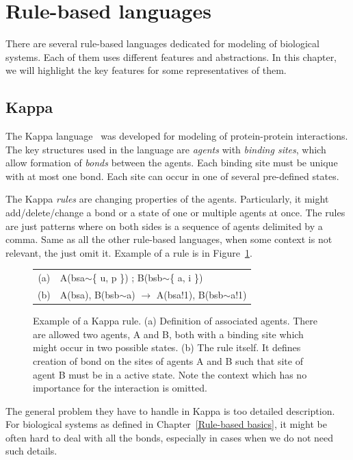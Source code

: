 \documentclass[12pt]{fithesis2}
\begin{document}
\section{Rule-based languages}
\label{rule_based_languages}

There are several rule-based languages dedicated for modeling of biological systems. Each of them uses different features and abstractions. In this chapter, we will highlight the key features for some representatives of them.

\subsection{Kappa}
\label{kappa}

The Kappa language~\cite{kappa_formal} was developed for modeling of protein-protein interactions. The key structures used in the language are \textit{agents} with \textit{binding sites}, which allow formation of \emph{bonds} between the agents. Each binding site must be unique with at most one bond. Each site can occur in one of several pre-defined states.

The Kappa \textit{rules} are changing properties of the agents. Particularly, it might add/delete/change a bond or a state of one or multiple agents at once. The rules are just patterns where on both sides is a sequence of agents delimited by a comma. Same as all the other rule-based languages, when some context is not relevant, the just omit it. Example of a rule is in Figure~\ref{kappa-rule}.

\begin{figure}[!h]
\begin{center}
\begin{tabular}{c l}
(a) & A(bsa$\sim$\{ u, p \}) ; B(bsb$\sim$\{ a, i \}) \\
(b) & A(bsa), B(bsb$\sim$a) $\rightarrow$ A(bsa!1), B(bsb$\sim$a!1) \\
\end{tabular}
\end{center}
\caption{Example of a Kappa rule. (a) Definition of associated agents. There are allowed two agents, A and B, both with a binding site which might occur in two possible states. (b) The rule itself. It defines creation of bond on the sites of agents A and B such that site of agent B must be in a active state. Note the context which has no importance for the interaction is omitted.}\label{kappa-rule}
\end{figure}

The general problem they have to handle in Kappa is too detailed description. For biological systems as defined in Chapter~\ref{Rule-based basics}, it might be often hard to deal with all the bonds, especially in cases when we do not need such details.
\end{document}
